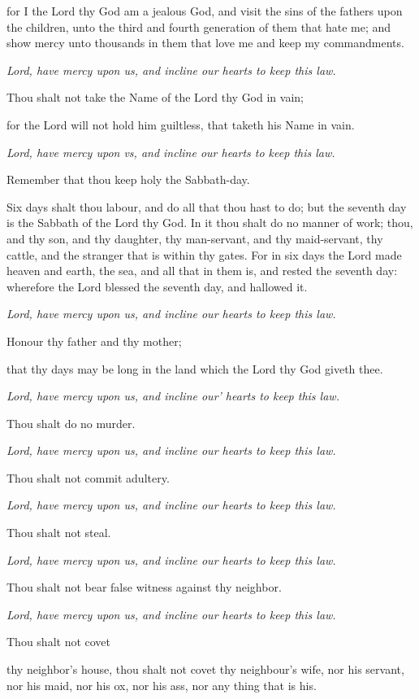 for I the Lord thy God am a jealous
God, and visit the sins of the fathers upon the children, unto the third
and fourth generation of them that hate me; and show mercy unto thousands
in them that love me and keep my commandments.

\emph{Lord,
have mercy upon us, and incline our hearts to keep this law.}

Thou
shalt not take the Name of the Lord thy God in vain;

for the Lord will not hold him guiltless,
that taketh his Name in vain.

\emph{Lord, have mercy upon vs, and incline our hearts
to keep this law.}

Remember that thou keep holy the Sabbath-day.

Six days shalt thou labour, and do
all that thou hast to do; but the seventh day is the Sabbath of the
Lord thy God. In it thou shalt do no manner of work; thou, and thy son,
and thy daughter, thy man-servant, and thy maid-servant, thy cattle,
and the stranger that is within thy gates. For in six days the Lord
made heaven and earth, the sea, and all that in them is, and rested
the seventh day: wherefore the Lord blessed the seventh day, and hallowed
it.

\emph{Lord, have mercy upon us, and incline our hearts
to keep this law.}

Honour thy father and thy mother;

that thy days may be long in the land
which the Lord thy God giveth thee.

\emph{Lord, have mercy upon us, and incline our’
hearts to keep this law.}

Thou shalt do no murder.

\emph{Lord, have mercy upon us, and incline our hearts
to keep this law.}

Thou shalt not commit adultery.

\emph{Lord, have mercy upon us, and incline our hearts
to keep this law.}

Thou shalt not steal.

\emph{Lord, have mercy upon us, and incline our hearts
to keep this law.}

Thou shalt not bear false witness against thy neighbor.

\emph{Lord, have mercy upon us, and incline our hearts
to keep this law.}

Thou shalt not covet

thy neighbor’s house, thou shalt
not covet thy neighbour’s wife, nor his servant, nor his maid,
nor his ox, nor his ass, nor any thing that is his.

